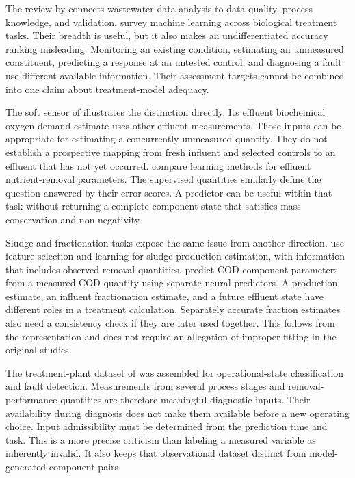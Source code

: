 The review by \citet{Newhart2019} connects wastewater data analysis to data quality, process knowledge, and validation. \citet{Sundui2021} survey machine learning across biological treatment tasks. Their breadth is useful, but it also makes an undifferentiated accuracy ranking misleading. Monitoring an existing condition, estimating an unmeasured constituent, predicting a response at an untested control, and diagnosing a fault use different available information. Their assessment targets cannot be combined into one claim about treatment-model adequacy.

The soft sensor of \citet{Ching2022} illustrates the distinction directly. Its effluent biochemical oxygen demand estimate uses other effluent measurements. Those inputs can be appropriate for estimating a concurrently unmeasured quantity. They do not establish a prospective mapping from fresh influent and selected controls to an effluent that has not yet occurred. \citet{ManavDemir2024} compare learning methods for effluent nutrient-removal parameters. The supervised quantities similarly define the question answered by their error scores. A predictor can be useful within that task without returning a complete component state that satisfies mass conservation and non-negativity.

Sludge and fractionation tasks expose the same issue from another direction. \citet{Ekinci2023} use feature selection and learning for sludge-production estimation, with information that includes observed removal quantities. \citet{Wang2024} predict COD component parameters from a measured COD quantity using separate neural predictors. A production estimate, an influent fractionation estimate, and a future effluent state have different roles in a treatment calculation. Separately accurate fraction estimates also need a consistency check if they are later used together. This follows from the representation and does not require an allegation of improper fitting in the original studies.

The treatment-plant dataset of \citet{Poch1993} was assembled for operational-state classification and fault detection. Measurements from several process stages and removal-performance quantities are therefore meaningful diagnostic inputs. Their availability during diagnosis does not make them available before a new operating choice. Input admissibility must be determined from the prediction time and task. This is a more precise criticism than labeling a measured variable as inherently invalid. It also keeps that observational dataset distinct from model-generated component pairs.

